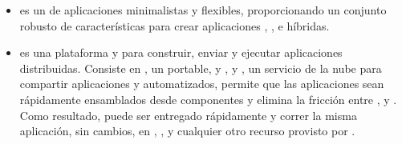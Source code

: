 \begin{itemize}
	\item \textbf{\expressjsNAME} es un \framework de aplicaciones \web \nodejsNAME minimalistas y flexibles, proporcionando un conjunto robusto de características  para crear aplicaciones \web \single, \multipage, e híbridas.
	
	\item \textbf{\docker} es una plataforma \openSourcePC y \sysadmins para construir, enviar y ejecutar aplicaciones distribuidas. Consiste en \docker \engine, un portable, \lightweight \runtime y \packaging \tool, y \docker \hub, un servicio de la nube para compartir aplicaciones y \workflows automatizados, \docker permite que las aplicaciones sean rápidamente ensamblados desde componentes y elimina la fricción entre \development, \qaSIGLA y \production \environments. Como resultado, puede ser entregado rápidamente y correr la misma aplicación, sin cambios, en \laptops, \data \centerCustom \vmsSIGLA, y cualquier otro recurso provisto por \internet \cite{technology_docker}.
	
\end{itemize}

